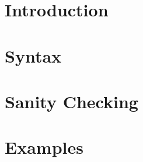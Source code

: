 \documentclass{report}[10pt]
\begin{document}
\sloppypar





\tableofcontents

\chapter{Introduction}
\label{Introduction}


\chapter{Syntax}
\label{Syntax}



\chapter{Sanity Checking}
\label{Sanity}


\chapter{Examples}
\label{Examples}






\newpage

\cleardoublepage

\printindex[com]
\printindex[var]
\printindex
\end{document}
